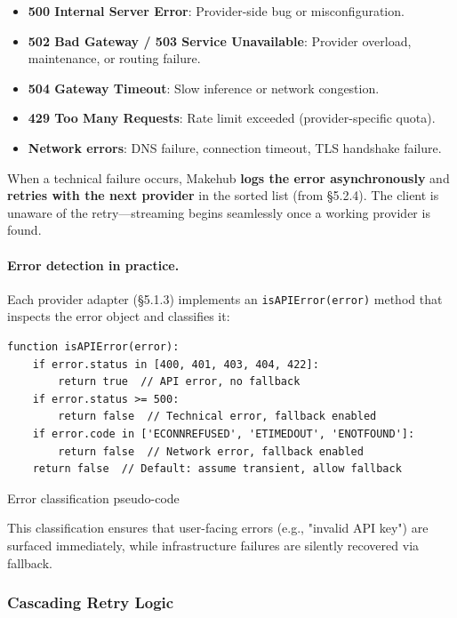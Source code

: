 \documentclass[english]{article}
\begin{document}
\begin{itemize}
    \item \textbf{500 Internal Server Error}: Provider-side bug or misconfiguration.
    \item \textbf{502 Bad Gateway / 503 Service Unavailable}: Provider overload, maintenance, or routing failure.
    \item \textbf{504 Gateway Timeout}: Slow inference or network congestion.
    \item \textbf{429 Too Many Requests}: Rate limit exceeded (provider-specific quota).
    \item \textbf{Network errors}: DNS failure, connection timeout, TLS handshake failure.
\end{itemize}

When a technical failure occurs, Makehub \textbf{logs the error asynchronously} and \textbf{retries with the next provider} in the sorted list (from §5.2.4). The client is unaware of the retry—streaming begins seamlessly once a working provider is found.

\paragraph{Error detection in practice.}

Each provider adapter (§5.1.3) implements an \texttt{isAPIError(error)} method that inspects the error object and classifies it:

\begin{listing}[H]
\begin{verbatim}
function isAPIError(error):
    if error.status in [400, 401, 403, 404, 422]:
        return true  // API error, no fallback
    if error.status >= 500:
        return false  // Technical error, fallback enabled
    if error.code in ['ECONNREFUSED', 'ETIMEDOUT', 'ENOTFOUND']:
        return false  // Network error, fallback enabled
    return false  // Default: assume transient, allow fallback
\end{verbatim}
\caption{Error classification pseudo-code}
\end{listing}

This classification ensures that user-facing errors (e.g., "invalid API key") are surfaced immediately, while infrastructure failures are silently recovered via fallback.

\subsubsection{Cascading Retry Logic}
\end{document}
